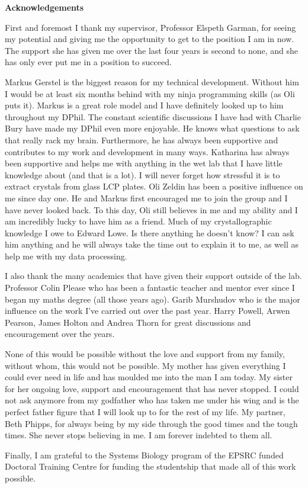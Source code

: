 \newenvironment{acknowledgements}%
{\cleardoublepage\thispagestyle{empty}\null\vfill\begin{center}%
\bfseries Acknowledgements\end{center}}%
{\vfill\null}
\begin{acknowledgements}
\small
\singlespacing
First and foremost I thank my supervisor, Professor Elspeth Garman, for seeing my potential and giving me the opportunity to get to the position I am in now.
The support she has given me over the last four years is second to none, and she has only ever put me in a position to succeed.

Markus Gerstel is the biggest reason for my technical development.
Without him I would be at least six months behind with my ninja programming skills (as Oli puts it).
Markus is a great role model and I have definitely looked up to him throughout my DPhil.
The constant scientific discussions I have had with Charlie Bury have made my DPhil even more enjoyable.
He knows what questions to ask that really rack my brain.
Furthermore, he has always been supportive and contributes to my work and development in many ways.
Katharina has always been supportive and helps me with anything in the wet lab that I have little knowledge about (and that is a lot).
I will never forget how stressful it is to extract crystals from glass LCP plates.
Oli Zeldin has been a positive influence on me since day one.
He and Markus first encouraged me to join the group and I have never looked back.
To this day, Oli still believes in me and my ability and I am incredibly lucky to have him as a friend.
Much of my crystallographic knowledge I owe to Edward Lowe.
Is there anything he doesn't know?
I can ask him anything and he will always take the time out to explain it to me, as well as help me with my data processing.

I also thank the many academics that have given their support outside of the lab.
Professor Colin Please who has been a fantastic teacher and mentor ever since I began my maths degree (all those years ago).
Garib Murshudov who is the major influence on the work I've carried out over the past year.
Harry Powell, Arwen Pearson, James Holton and Andrea Thorn for great discussions and encouragement over the years.

None of this would be possible without the love and support from my family, without whom, this would not be possible.
My mother has given everything I could ever need in life and has moulded me into the man I am today.
My sister for her ongoing love, support and encouragement that has never stopped.
I could not ask anymore from my godfather who has taken me under his wing and is the perfect father figure that I will look up to for the rest of my life.
My partner, Beth Phipps, for always being by my side through the good times and the tough times.
She never stops believing in me.
I am forever indebted to them all.

Finally, I am grateful to the Systems Biology program of the EPSRC funded Doctoral Training Centre for funding the studentship that made all of this work possible.
\end{acknowledgements}
